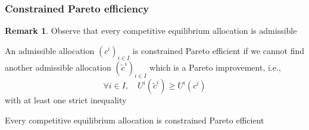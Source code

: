 \documentclass[blue]{beamer}
\def\geq{\geqslant}
\theoremstyle{definition}
\theoremstyle{example}
\newtheorem*{remark}{Remark}
\begin{document}
\begin{frame}\frametitle{Constrained Pareto efficiency}

\begin{remark}
Observe that every competitive equilibrium allocation is admissible
\end{remark}

\begin{definition}
An admissible allocation $(c^i)_{i\in I}$ is constrained Pareto efficient if we cannot find another admissible allocation $(\widetilde{c}^i)_{i\in I}$ which is a Pareto improvement, i.e.,
\[
\forall i\in I, \quad U^i(\widetilde{c}^i) \geq U^i(c^i)
\]
with at least one strict inequality
\end{definition}

\begin{theorem}
Every competitive equilibrium allocation is constrained Pareto efficient
\end{theorem}

\end{frame}
\end{document}
